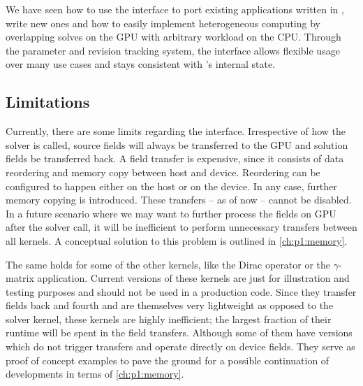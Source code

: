 We have seen how to use the interface to port existing applications written in \openqxd, write new ones and how to easily implement heterogeneous computing by overlapping solves on the GPU with arbitrary workload on the CPU.
Through the parameter and revision tracking system, the interface allows flexible usage over many use cases and stays consistent with \openqxd's internal state.


\subsection{Limitations}

Currently, there are some limits regarding the interface.
Irrespective of how the solver is called, source fields will always be transferred to the GPU and solution fields be transferred back.
A field transfer is expensive, since it consists of data reordering and memory copy between host and device.
Reordering can be configured to happen either on the host or on the device.
In any case, further memory copying is introduced.
These transfers -- as of now -- cannot be disabled.
In a future scenario where we may want to further process the fields on GPU after the solver call, it will be inefficient to perform unnecessary transfers between all kernels.
A conceptual solution to this problem is outlined in \cref{ch:p1:memory}.

The same holds for some of the other kernels, like the Dirac operator or the $\gamma$-matrix application.
Current versions of these kernels are just for illustration and testing purposes and should not be used in a production code.
Since they transfer fields back and fourth and are themselves very lightweight as opposed to the solver kernel, these kernels are highly inefficient; the largest fraction of their runtime will be spent in the field transfers.
Although some of them have versions which do not trigger transfers and operate directly on device fields.
They serve as proof of concept examples to pave the ground for a possible continuation of developments in terms of \cref{ch:p1:memory}.

